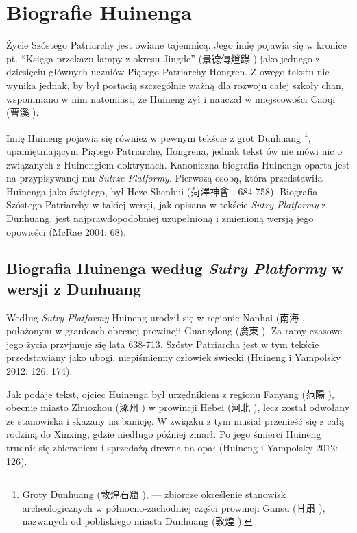 \chapter{Biografie Huinenga}
Życie Szóstego Patriarchy jest owiane tajemnicą. Jego imię pojawia się w kronice pt. ``Księga przekazu lampy z okresu Jingde'' (景德傳燈錄 ) jako jednego z dziesięciu głównych uczniów Piątego Patriarchy Hongren.
Z owego tekstu nie wynika jednak, by był postacią szczególnie ważną dla rozwoju całej szkoły chan, wspomniano w nim natomiast, że Huineng żył i nauczał w miejscowości Caoqi (曹溪 ).

Imię Huineng pojawia się również w pewnym tekście z grot Dunhuang%
\footnote{Groty Dunhuang (敦煌石窟 ), --- zbiorcze określenie stanowisk archeologicznych w północno-zachodniej części prowincji Gansu (甘肅 ), nazwanych od pobliskiego miasta Dunhuang (敦煌 ).},
upamiętniającym Piątego Patriarchę, Hongrena, jednak tekst ów nie mówi nic o związanych z Huinengiem doktrynach.
Kanoniczna biografia Huinenga oparta jest na przypisywanej mu \textit{Sutrze Platformy}. Pierwszą osobą, która przedstawiła Huinenga jako świętego, był Heze Shenhui (菏澤神會 , 684-758).
Biografia Szóstego Patriarchy w takiej wersji, jak opisana w tekście \textit{Sutry Platformy} z Dunhuang, jest najprawdopodobniej uzupełnioną i zmienioną wersją jego opowieści (McRae 2004: 68).

\section{Biografia Huinenga według \textit{Sutry Platformy} w wersji z Dunhuang}
Według \textit{Sutry Platformy} Huineng urodził się w regionie Nanhai (南海 , położonym w granicach obecnej prowincji Guangdong (廣東 ).
Za ramy czasowe jego życia przyjmuje się lata 638-713. Szósty Patriarcha jest w tym tekście przedstawiany jako ubogi, niepiśmienny człowiek świecki
(Huineng i Yampolsky 2012: 126, 174).

Jak podaje tekst, ojciec Huinenga był urzędnikiem z regionu Fanyang (范陽 ), obecnie miasto Zhuozhou (涿州 ) w prowincji Hebei (河北 ), lecz został odwołany ze stanowiska i skazany na banicję.
W związku z tym musiał przenieść się z całą rodziną do Xinxing, gdzie niedługo później zmarł. Po jego śmierci Huineng trudnił się zbieraniem i sprzedażą drewna na opał
(Huineng i Yampolsky 2012: 126).

